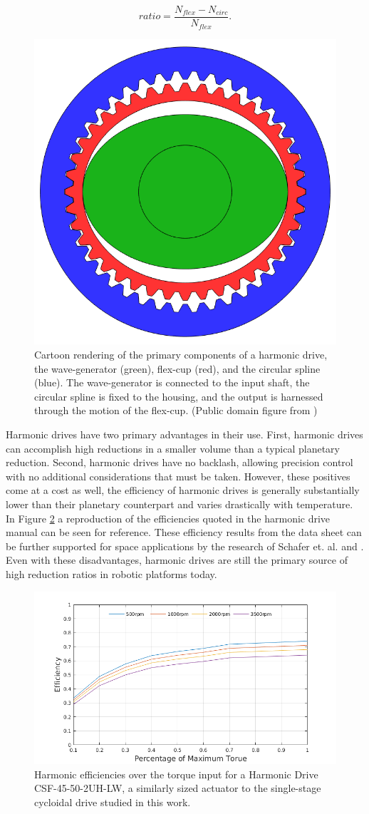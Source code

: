 \begin{equation} \label{eq:harmonic_ratio}
ratio = \frac{N_{flex} - N_{circ}} {N_{flex}}.
\end{equation}

\begin{figure}[t]
   \centering
   \includegraphics[width=0.3\linewidth]{fig/harmonic_blank}
   \caption{Cartoon rendering of the primary components of a harmonic drive, the wave-generator (green), flex-cup (red), and the circular spline (blue). The wave-generator is connected to the input shaft, the circular spline is fixed to the housing, and the output is harnessed through the motion of the flex-cup. (Public domain figure from \cite{ref:harmonic_cartoon})}
   \label{fig:harmonic_cartoon}
\end{figure}

Harmonic drives have two primary advantages in their use. First, harmonic drives can accomplish high reductions in a smaller volume than a typical planetary reduction. Second, harmonic drives have no backlash, allowing precision control with no additional considerations that must be taken. However, these positives come at a cost as well, the efficiency of harmonic drives is generally substantially lower than their planetary counterpart and varies drastically with temperature. In Figure \ref{fig:harmonic_eff} a reproduction of the efficiencies quoted in the harmonic drive manual \cite{ref:harmonic_sheet} can be seen for reference. These efficiency results from the data sheet can be further supported for space applications by the research of Schafer et. al. \cite{ref:harmonic_space_lube} and \cite{ref:harmonic_performance}. Even with these disadvantages, harmonic drives are still the primary source of high reduction ratios in robotic platforms today. 

\begin{figure}[t]
   \centering
   \includegraphics[width=0.7\linewidth]{fig/harmonic_eff}
   \caption{Harmonic efficiencies over the torque input for a Harmonic Drive CSF-45-50-2UH-LW, a similarly sized actuator to the single-stage cycloidal drive studied in this work.}
   \label{fig:harmonic_eff}
\end{figure}

